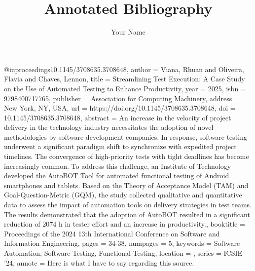 \documentclass[12pt]{article}
\title{\textbf{Annotated Bibliography}}
\author{Your Name}
\begin{document}
\maketitle

@inproceedings{10.1145/3708635.3708648,
author = {Viana, Rhuan and Oliveira, Flavia and Chaves, Lennon},
title = {Streamlining Test Execution: A Case Study on the Use of Automated Testing to Enhance Productivity},
year = {2025},
isbn = {9798400717765},
publisher = {Association for Computing Machinery},
address = {New York, NY, USA},
url = {https://doi.org/10.1145/3708635.3708648},
doi = {10.1145/3708635.3708648},
abstract = {An increase in the velocity of project delivery in the technology industry necessitates the adoption of novel methodologies by software development companies. In response, software testing underwent a significant paradigm shift to synchronize with expedited project timelines. The convergence of high-priority tests with tight deadlines has become increasingly common. To address this challenge, an Institute of Technology developed the AutoBOT Tool for automated functional testing of Android smartphones and tablets. Based on the Theory of Acceptance Model (TAM) and Goal-Question-Metric (GQM), the study collected qualitative and quantitative data to assess the impact of automation tools on delivery strategies in test teams. The results demonstrated that the adoption of AutoBOT resulted in a significant reduction of 2074 h in tester effort and an increase in productivity.},
booktitle = {Proceedings of the 2024 13th International Conference on Software and Information Engineering},
pages = {34-38},
numpages = {5},
keywords = {Software Automation, Software Testing, Functional Testing},
location = {
},
series = {ICSIE '24},
annote = {Here is what I have to say regarding this source.}
}

\nocite{*}



\end{document}
